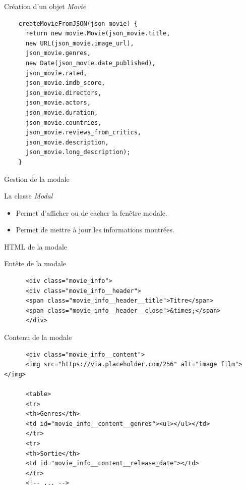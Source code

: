 \begin{frame}[fragile]{Création d'un objet \textit{Movie}}
  \small
  \begin{verbatim}
    createMovieFromJSON(json_movie) {
      return new movie.Movie(json_movie.title,
      new URL(json_movie.image_url),
      json_movie.genres,
      new Date(json_movie.date_published),
      json_movie.rated,
      json_movie.imdb_score,
      json_movie.directors,
      json_movie.actors,
      json_movie.duration,
      json_movie.countries,
      json_movie.reviews_from_critics,			       
      json_movie.description,
      json_movie.long_description);
    }
  \end{verbatim}
\end{frame}

\begin{frame}{Gestion de la modale}
  \begin{block}{La classe \textit{Modal}}
    \begin{itemize}
    \item Permet d'afficher ou de cacher la fenêtre modale.
    \item Permet de mettre à jour les informations montrées.
    \end{itemize}
  \end{block}
\end{frame}

\begin{frame}[fragile]{HTML de la modale}
  \begin{block}{Entête de la modale}
    \tiny
    \begin{verbatim}
      <div class="movie_info">
      <div class="movie_info__header">
      <span class="movie_info__header__title">Titre</span>
      <span class="movie_info__header__close">&times;</span>	  
      </div>
    \end{verbatim}
  \end{block}

  \begin{block}{Contenu de la modale}
    \tiny
    \begin{verbatim}
      <div class="movie_info__content">
      <img src="https://via.placeholder.com/256" alt="image film"></img>

      <table>
      <tr>
      <th>Genres</th>
      <td id="movie_info__content__genres"><ul></ul></td>
      </tr>
      <tr>
      <th>Sortie</th>
      <td id="movie_info__content__release_date"></td>
      </tr>
      <!-- ... -->
    \end{verbatim}
  \end{block}

\end{frame}

